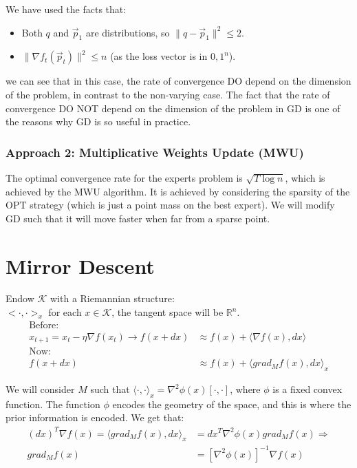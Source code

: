 \documentclass[11pt]{book} %
\begin{document}
We have used the facts that: 
\begin{itemize}
    \item Both $q$ and $\vec{p}_1$ are distributions, so $\| q - \vec{p}_1 \|^2 \leq 2$.
    \item $\| \nabla f_t(\vec{p}_t) \|^2 \leq n$ (as the loss vector is in ${0,1}^n$).
\end{itemize}

we can see that in this case, the rate of convergence DO depend on the dimension of the problem, in contrast to the non-varying case.
The fact that the rate of convergence DO NOT depend on the dimension of the problem in GD is one of the reasons why GD is so useful in practice.


\subsubsection{Approach 2: Multiplicative Weights Update (MWU)}

The optimal convergence rate for the experts problem is $\sqrt{T \log n}$, which is achieved by the MWU algorithm.
It is achieved by considering the sparsity of the OPT strategy (which is just a point mass on the best expert). 
We will modify GD such that it will move faster when far from a sparse point.

\medbreak



\section{Mirror Descent}

Endow $\mathcal{K}$ with a Riemannian structure: \\
$<\cdot, \cdot>_x$ for each $x \in \mathcal{K}$, the tangent space will be $\mathbb{R}^n$. \\
\begin{align*}
    \text{Before:}\\
    x_{t+1} = x_t - \eta \nabla f(x_t) \rightarrow f(x + dx) &\approx f(x) + \langle \nabla f(x) , dx \rangle \\
    \text{Now:}\\
   f(x + dx) &\approx f(x) + \langle grad_M f(x) , dx \rangle_x
\end{align*}

We will consider $M$ such that $\langle \cdot, \cdot \rangle_x = \nabla^2 \phi (x) [\cdot, \cdot]$, where $\phi$ is a fixed convex function. 
The function $\phi$ encodes the geometry of the space, and this is where the prior information is encoded. We get that:
\begin{align*}
    (dx)^T  \nabla f(x) = \langle grad_M f(x) , dx \rangle_x &= dx^T \nabla^2 \phi(x) grad_M f(x) \Rightarrow \\
    grad_M f(x) &= [\nabla^2 \phi(x)]^{-1} \nabla f(x)
\end{align*}
\end{document}
